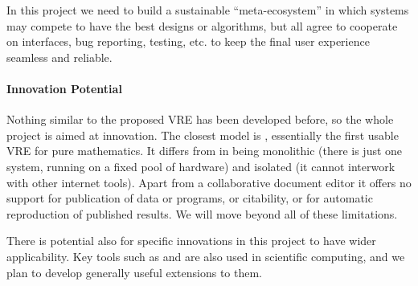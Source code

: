 In this project we need to build a sustainable ``meta-ecosystem'' in
which systems may compete to have the best designs or algorithms, but
all agree to cooperate on interfaces, bug reporting, testing, etc. to
keep the final user experience seamless and reliable.


\paragraph{Innovation Potential}

Nothing similar to the proposed \TheProject VRE has been developed
before, so the whole project is aimed at innovation. The closest model
is \SMC, essentially the first usable VRE for pure mathematics. It
differs from \TheProject in being monolithic (there is just one
system, running on a fixed pool of hardware) and isolated (it cannot
interwork with other internet tools). Apart from a collaborative
document editor it offers no support for publication of data or
programs, or citability, or for automatic reproduction of published
results. We will move beyond all of these limitations.

There is potential also for specific innovations in this project to
have wider applicability. Key tools such as \iPython and \Jupyter are
also used in scientific computing, and we plan to develop generally
useful extensions to them.




